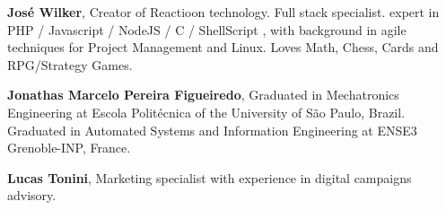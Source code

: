 \documentclass[
	article,			%
	12pt,				%
	oneside,			%
	a4paper,			%
	brazil,				%
	english,
	sumario=tradicional
	]{abntex2}
\begin{document}






\textbf{José Wilker}, Creator of Reactioon technology. Full stack specialist. expert in PHP / Javascript / NodeJS / C / ShellScript , with background in agile techniques for Project Management and Linux. Loves Math, Chess, Cards and RPG/Strategy Games.

\textbf{Jonathas Marcelo Pereira Figueiredo}, Graduated in Mechatronics Engineering at Escola Politécnica of the University of São Paulo, Brazil. Graduated in Automated Systems and  Information Engineering at ENSE3 Grenoble-INP, France.

\textbf{Lucas Tonini}, Marketing specialist with experience in digital campaigns advisory.


\end{document}
